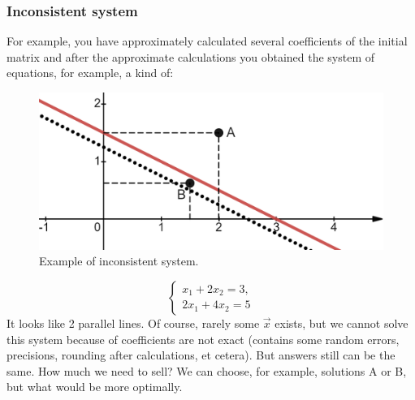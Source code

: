     \subsubsection*{Inconsistent system}
    For example, you have approximately calculated several coefficients of the initial matrix and after the approximate calculations you obtained the system of equations, for example, a kind of: 
    \begin{figure}
        \includegraphics[height=0.25\columnwidth, width=0.4\columnwidth]{lectures/images/inconsistent_system.png}
        \caption*{\scriptsize{Example of inconsistent system.}}
        \label{fig:inconsistent}
    \end{figure}
    \[
        \left\{ \begin{array}{c}
        x_1 + 2x_2 = 3,\\
        2x_1 + 4x_2 = 5
           \end{array}
        \right. 
    \]
    It looks like 2 parallel lines. Of course, rarely some $\vec{x}$ exists, but we cannot solve this system because of coefficients are not exact (contains some random errors, precisions, rounding after calculations, et cetera). But answers still can be the same. How much we need to sell? We can choose, for example, solutions A or B, but what would be more optimally.
